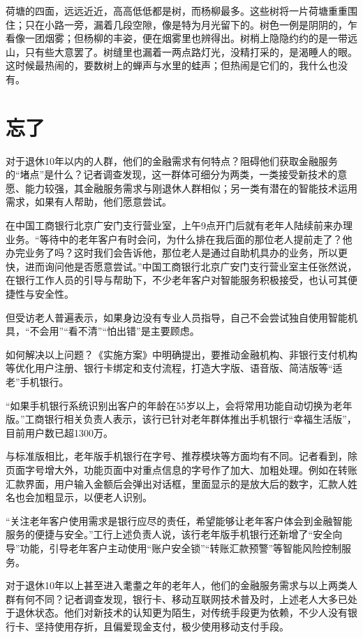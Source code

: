 \documentclass{ecnuthesis}
\begin{document}
荷塘的四面，远远近近，高高低低都是树，而杨柳最多。这些树将一片荷塘重重围住；只在小路一旁，漏着几段空隙，像是特为月光留下的。树色一例是阴阴的，乍看像一团烟雾；但杨柳的丰姿，便在烟雾里也辨得出。树梢上隐隐约约的是一带远山，只有些大意罢了。树缝里也漏着一两点路灯光，没精打采的，是渴睡人的眼。这时候最热闹的，要数树上的蝉声与水里的蛙声；但热闹是它们的，我什么也没有。

\chapter{忘了}

对于退休10年以内的人群，他们的金融需求有何特点？阻碍他们获取金融服务的“堵点”是什么？记者调查发现，这一群体可细分为两类，一类接受新技术的意愿、能力较强，其金融服务需求与刚退休人群相似；另一类有潜在的智能技术运用需求，如果有人帮助，他们愿意尝试。

在中国工商银行北京广安门支行营业室，上午9点开门后就有老年人陆续前来办理业务。“等待中的老年客户有时会问，为什么排在我后面的那位老人提前走了？他办完业务了吗？这时我们会告诉他，那位老人是通过自助机具办的业务，所以更快，进而询问他是否愿意尝试。”中国工商银行北京广安门支行营业室主任张然说，在银行工作人员的引导与帮助下，不少老年客户对智能服务积极接受，也认可其便捷性与安全性。

但受访老人普遍表示，如果身边没有专业人员指导，自己不会尝试独自使用智能机具，“不会用”“看不清”“怕出错”是主要顾虑。

如何解决以上问题？《实施方案》中明确提出，要推动金融机构、非银行支付机构等优化用户注册、银行卡绑定和支付流程，打造大字版、语音版、简洁版等“适老”手机银行。

“如果手机银行系统识别出客户的年龄在55岁以上，会将常用功能自动切换为老年版。”工商银行相关负责人表示，该行已针对老年群体推出手机银行“幸福生活版”，目前用户数已超1300万。

与标准版相比，老年版手机银行在字号、推荐模块等方面均有不同。记者看到，除页面字号增大外，功能页面中对重点信息的字号作了加大、加粗处理。例如在转账汇款界面，用户输入金额后会弹出对话框，里面显示的是放大后的数字，汇款人姓名也会加粗显示，以便老人识别。

“关注老年客户使用需求是银行应尽的责任，希望能够让老年客户体会到金融智能服务的便捷与安全。”工行上述负责人说，该行老年版手机银行还新增了“安全向导”功能，引导老年客户主动使用“账户安全锁”“转账汇款预警”等智能风险控制服务。

对于退休10年以上甚至进入耄耋之年的老年人，他们的金融服务需求与以上两类人群有何不同？记者调查发现，银行卡、移动互联网技术普及时，上述老人大多已处于退休状态。他们对新技术的认知更为陌生，对传统手段更为依赖，不少人没有银行卡、坚持使用存折，且偏爱现金支付，极少使用移动支付手段。
\end{document}
